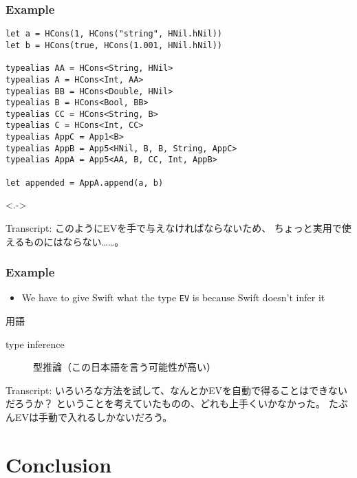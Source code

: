 \begin{frame}[fragile]
  \frametitle{Example}

\begin{lstlisting}[style=swift]
let a = HCons(1, HCons("string", HNil.hNil))
let b = HCons(true, HCons(1.001, HNil.hNil))

typealias AA = HCons<String, HNil>
typealias A = HCons<Int, AA>
typealias BB = HCons<Double, HNil>
typealias B = HCons<Bool, BB>
typealias CC = HCons<String, B>
typealias C = HCons<Int, CC>
typealias AppC = App1<B>
typealias AppB = App5<HNil, B, B, String, AppC>
typealias AppA = App5<AA, B, CC, Int, AppB>

let appended = AppA.append(a, b)
\end{lstlisting}

  \uncover<.->{
  }

  \begin{notes}
    \item Transcript:
    このようにEVを手で与えなければならないため、
    ちょっと実用で使えるものにはならない……。
  \end{notes}
\end{frame}

\begin{frame}[fragile]
  \frametitle{Example}

  \begin{itemize}
    \item<+-> We have to give Swift what the type \lstinline|EV| is
    because Swift doesn't infer it
  \end{itemize}

  \begin{notes}
    \item 用語
    \begin{description}
      \item[type inference] 型推論（この日本語を言う可能性が高い）
    \end{description}
    
    \item Transcript:
    いろいろな方法を試して、なんとかEVを自動で得ることはできないだろうか？
    ということを考えていたものの、どれも上手くいかなかった。
    たぶんEVは手動で入れるしかないだろう。
  \end{notes}
\end{frame}

\section{Conclusion}

